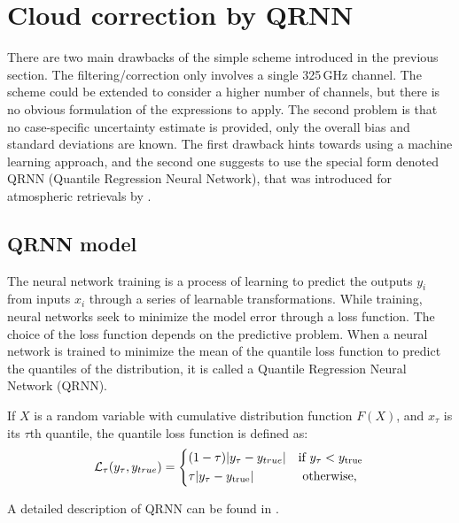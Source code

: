 \documentclass[12pt]{article}
\begin{document}
\section{Cloud correction by QRNN}
%
There are two main drawbacks of the simple scheme introduced in the previous
section. The filtering/correction only involves a single 325\,GHz channel. The
scheme could be extended to consider a higher number of channels, but there is
no obvious formulation of the expressions to apply. The second problem is that
no case-specific uncertainty estimate is provided, only the overall bias and
standard deviations are known. The first drawback hints towards using a machine
learning approach, and the second one suggests to use the special form denoted
QRNN (Quantile Regression Neural Network), that was introduced for atmospheric
retrievals by \citet{pfreundschuh:aneur:18}.

\subsection{QRNN model}
%
The neural network training is a process of learning to predict the outputs {$y_i$} from inputs {$x_i$} through a series of learnable transformations. While training, neural networks seek to minimize the model error through a loss function. The choice of the loss function depends on the predictive problem. When a neural network is trained to minimize the mean of the quantile loss function to predict the quantiles of the distribution, it is called a Quantile Regression Neural Network (QRNN). 

If $X$ is a random variable with cumulative distribution function $F(X)$, and $x_{\tau}$ is its $\tau$th quantile, the quantile loss function is defined as:
\begin{equation}
\mathcal{L}_\tau(y_\tau, y_{true}) =
\begin{cases*}
(1 - \tau)|y_\tau - y_{true}| &\text{if}  $y_\tau < y_\text{true}$\\
\tau |y_\tau - y_\text{true}| & \text{ otherwise, }
\end{cases*}
\label{loss_function}
\end{equation}

A detailed description of QRNN can be found in \citet{pfreundschuh:aneur:18}.  
\end{document}
